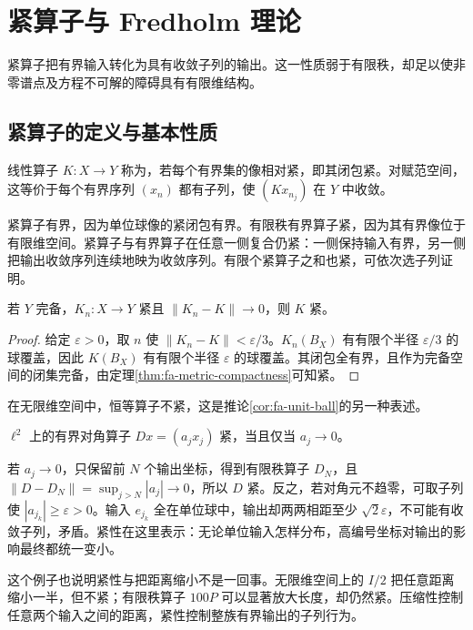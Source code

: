 \documentclass[UTF8,12pt,a4paper,fontset=fandol]{ctexbook}
\begin{document}
\chapter{紧算子与 Fredholm 理论}
\label{chap:fa-compact}

紧算子把有界输入转化为具有收敛子列的输出。这一性质弱于有限秩，却足以使非零谱点及方程不可解的障碍具有有限维结构。

\section{紧算子的定义与基本性质}
\begin{definition}
线性算子 $K:X\to Y$ 称为，若每个有界集的像相对紧，即其闭包紧。对赋范空间，这等价于每个有界序列 $(x_n)$ 都有子列，使 $(Kx_{n_j})$ 在 $Y$ 中收敛。
\end{definition}
紧算子有界，因为单位球像的紧闭包有界。有限秩有界算子紧，因为其有界像位于有限维空间。紧算子与有界算子在任意一侧复合仍紧：一侧保持输入有界，另一侧把输出收敛序列连续地映为收敛序列。有限个紧算子之和也紧，可依次选子列证明。

\begin{proposition}\label{prop:fa-compact-closed}
若 $Y$ 完备，$K_n:X\to Y$ 紧且 $\|K_n-K\|\to0$，则 $K$ 紧。
\end{proposition}
\begin{proof}
给定 $\varepsilon>0$，取 $n$ 使 $\|K_n-K\|<\varepsilon/3$。$K_n(B_X)$ 有有限个半径 $\varepsilon/3$ 的球覆盖，因此 $K(B_X)$ 有有限个半径 $\varepsilon$ 的球覆盖。其闭包全有界，且作为完备空间的闭集完备，由定理\ref{thm:fa-metric-compactness}可知紧。
\end{proof}
在无限维空间中，恒等算子不紧，这是推论\ref{cor:fa-unit-ball}的另一种表述。

\begin{example}[尾部衰减怎样产生紧性]\label{ex:fa-diagonal-compactness}
$\ell^2$ 上的有界对角算子 $Dx=(a_jx_j)$ 紧，当且仅当 $a_j\to0$。
\end{example}
\begin{solve}
若 $a_j\to0$，只保留前 $N$ 个输出坐标，得到有限秩算子 $D_N$，且 $\|D-D_N\|=\sup_{j>N}|a_j|\to0$，所以 $D$ 紧。反之，若对角元不趋零，可取子列使 $|a_{j_k}|\geq\varepsilon>0$。输入 $e_{j_k}$ 全在单位球中，输出却两两相距至少 $\sqrt2\varepsilon$，不可能有收敛子列，矛盾。紧性在这里表示：无论单位输入怎样分布，高编号坐标对输出的影响最终都统一变小。
\end{solve}

这个例子也说明紧性与把距离缩小不是一回事。无限维空间上的 $I/2$ 把任意距离缩小一半，但不紧；有限秩算子 $100P$ 可以显著放大长度，却仍然紧。压缩性控制任意两个输入之间的距离，紧性控制整族有界输出的子列行为。
\end{document}
